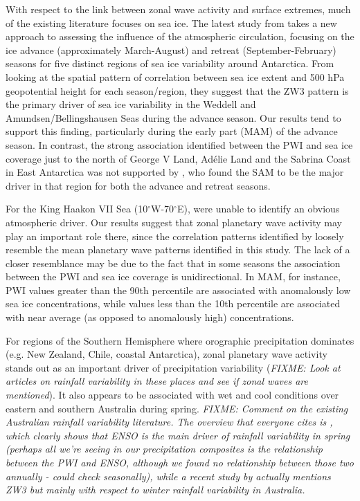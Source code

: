 With respect to the link between zonal wave activity and surface extremes, much of the existing literature focuses on sea ice. The latest study from \citet{Raphael2014} takes a new approach to assessing the influence of the atmospheric circulation, focusing on the ice advance (approximately March-August) and retreat (September-February) seasons for five distinct regions of sea ice variability around Antarctica. From looking at the spatial pattern of correlation between sea ice extent and 500 hPa geopotential height for each season/region, they suggest that the ZW3 pattern is the primary driver of sea ice variability in the Weddell and Amundsen/Bellingshausen Seas during the advance season. Our results tend to support this finding, particularly during the early part (MAM) of the advance season. In contrast, the strong association identified between the PWI and sea ice coverage just to the north of George V Land, Ad{\'e}lie Land and the Sabrina Coast in East Antarctica was not supported by \citet{Raphael2014}, who found the SAM to be the major driver in that region for both the advance and retreat seasons. 

For the King Haakon VII Sea (10$^{\circ}$W-70$^{\circ}$E), \citet{Raphael2014} were unable to identify an obvious atmospheric driver. Our results suggest that zonal planetary wave activity may play an important role there, since the correlation patterns identified by \citet{Raphael2014} loosely resemble the mean planetary wave patterns identified in this study. The lack of a closer resemblance may be due to the fact that in some seasons the association between the PWI and sea ice coverage is unidirectional. In MAM, for instance, PWI values greater than the 90th percentile are associated with anomalously low sea ice concentrations, while values less than the 10th percentile are associated with near average (as opposed to anomalously high) concentrations.

For regions of the Southern Hemisphere where orographic precipitation dominates (e.g. New Zealand, Chile, coastal Antarctica), zonal planetary wave activity stands out as an important driver of precipitation variability (\textit{FIXME: Look at articles on rainfall variability in these places and see if zonal waves are mentioned}). It also appears to be associated with wet and cool conditions over eastern and southern Australia during spring. \textit{FIXME: Comment on the existing Australian rainfall variability literature. The overview that everyone cites is \citet{Risbey2009}, which clearly shows that ENSO is the main driver of rainfall variability in spring (perhaps all we're seeing in our precipitation composites is the relationship between the PWI and ENSO, although we found no relationship between those two annually - could check seasonally), while a recent study by \citet{Frederiksen2014} actually mentions ZW3 but mainly with respect to winter rainfall variability in Australia.}

